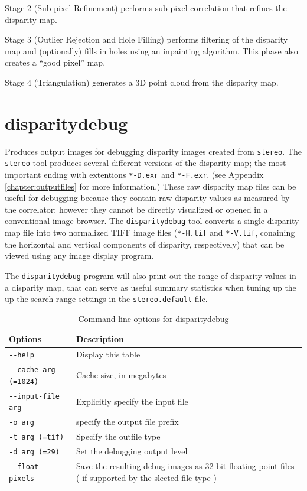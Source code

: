 Stage 2 (Sub-pixel Refinement) performs sub-pixel correlation that
refines the disparity map.

Stage 3 (Outlier Rejection and Hole Filling) performs filtering of the
disparity map and (optionally) fills in holes using an inpainting
algorithm.  This phase also creates a ``good pixel'' map.

Stage 4 (Triangulation) generates a 3D point cloud from the disparity
map.

\section{disparitydebug}
\label{disparitydebug}

Produces output images for debugging disparity images created from
\verb#stereo#. The {\tt stereo} tool produces several different
versions of the disparity map; the most important ending with
extentions \verb#*-D.exr# and \verb#*-F.exr#. (see Appendix
\ref{chapter:outputfiles} for more information.)  These raw disparity
map files can be useful for debugging because they contain raw
disparity values as measured by the correlator; however they cannot be
directly visualized or opened in a conventional image browser.  The
\verb#disparitydebug# tool converts a single disparity map file into
two normalized TIFF image files (\verb#*-H.tif# and \verb#*-V.tif#,
conaining the horizontal and vertical components of disparity,
respectively) that can be viewed using any image display program.

The {\tt disparitydebug} program will also print out the range of
disparity values in a disparity map, that can serve as useful summary
statistics when tuning up the up the search range settings in the
{\tt stereo.default} file.

\begin{longtable}{|l|p{10cm}|}
\caption{Command-line options for disparitydebug}
\label{tbl:disparitydebug}
\endfirsthead
\endhead
\endfoot
\endlastfoot
\hline
Options & Description \\ \hline \hline
\verb#--help# & Display this table \\ \hline
\verb#--cache arg (=1024)# & Cache size, in megabytes \\ \hline
\verb#--input-file arg# & Explicitly specify the input file \\ \hline
\verb#-o arg# & specify the output file prefix \\ \hline
\verb#-t arg (=tif)# & Specify the outfile type \\ \hline
\verb#-d arg (=29)# & Set the debugging output level \\ \hline
\verb#--float-pixels# & Save the resulting debug images as 32 bit floating point files ( if supported by the slected file type ) \\ \hline
\end{longtable}

